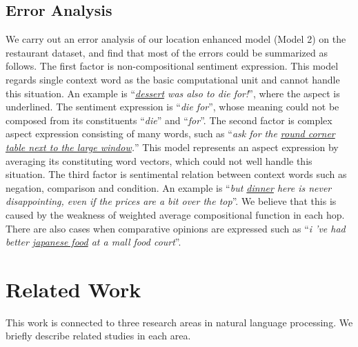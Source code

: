 \documentclass[11pt,letterpaper]{article}
\begin{document}
\subsection{Error Analysis}
We carry out an error analysis of our location enhanced model (Model 2) on the restaurant dataset, and find that most of the errors could be summarized as follows.
The first factor is non-compositional sentiment expression. This model regards single context word as the basic computational unit and cannot handle this situation.
An example is ``\textit{\underline{dessert} was also to die for!}'', where the aspect is underlined.
The sentiment expression is ``\textit{die for}'', whose meaning could not be composed from its constituents ``\textit{die}'' and ``\textit{for}''.
The second factor is complex aspect expression consisting of many words, such as 
``\textit{ask for the \underline{round corner table next to the large window}.}''
This model represents an aspect expression by averaging its constituting word vectors, which could not well handle this situation.
The third factor is sentimental relation between context words such as negation, comparison and condition.
An example is ``\textit{but \underline{dinner} here is never disappointing, even if the prices are a bit over the top}''.
We believe that this is caused by the weakness of weighted average compositional function in each hop.
There are also cases when comparative opinions are expressed such as ``\textit{i 've had better \underline{japanese food} at a mall food court}''.


\section{Related Work}
This work is connected to three research areas in natural language processing. 
We briefly describe related studies in each area. 
\end{document}
